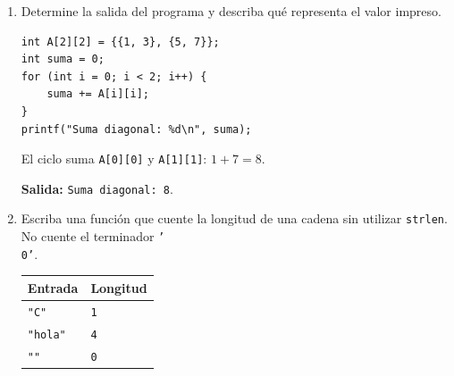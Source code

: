 \begin{enumerate}[label=\textbf{\arabic*.}]
\begin{enumerate}[label=(\alph*)]
\item Escriba la condición que detecta un peso inválido.
\ifpauta\begin{solucionbox}\texttt{peso <= 0.0f || peso > 25.0f}.\end{solucionbox}\else\vspace{1.5cm}\fi
\item Escriba un fragmento que imprima si el paquete es aceptado o rechazado.
\ifpauta\begin{solucionbox}\begin{lstlisting}[style=customc]
if (peso > 0.0f && peso <= 25.0f) {
    printf("Paquete aceptado\n");
} else {
    printf("Paquete rechazado\n");
}
\end{lstlisting}\end{solucionbox}\else\vspace{2cm}\fi
\item Indique el resultado para \texttt{0.0}, \texttt{0.5}, \texttt{25.0} y \texttt{25.1}.
\ifpauta\begin{solucionbox}0.0: rechazado; 0.5: aceptado; 25.0: aceptado; 25.1: rechazado.\end{solucionbox}\else\vspace{2cm}\fi
\end{enumerate}
\newpage
\item Determine la salida del programa y describa qué representa el valor impreso.
\begin{lstlisting}[style=customc]
int A[2][2] = {{1, 3}, {5, 7}};
int suma = 0;
for (int i = 0; i < 2; i++) {
    suma += A[i][i];
}
printf("Suma diagonal: %d\n", suma);
\end{lstlisting}
\ifpauta\begin{solucionbox}El ciclo suma \texttt{A[0][0]} y \texttt{A[1][1]}: $1+7=8$.\par\textbf{Salida:} \texttt{Suma diagonal: 8}.\end{solucionbox}\else\vspace{3cm}\fi
\item Escriba una función que cuente la longitud de una cadena sin utilizar \texttt{strlen}. No cuente el terminador \texttt{'\\0'}.
\begin{center}\begin{tabular}{ll}\toprule\textbf{Entrada} & \textbf{Longitud}\\\midrule\texttt{"C"} & \texttt{1}\\\texttt{"hola"} & \texttt{4}\\\texttt{""} & \texttt{0}\\\bottomrule\end{tabular}\end{center}

\end{enumerate}
